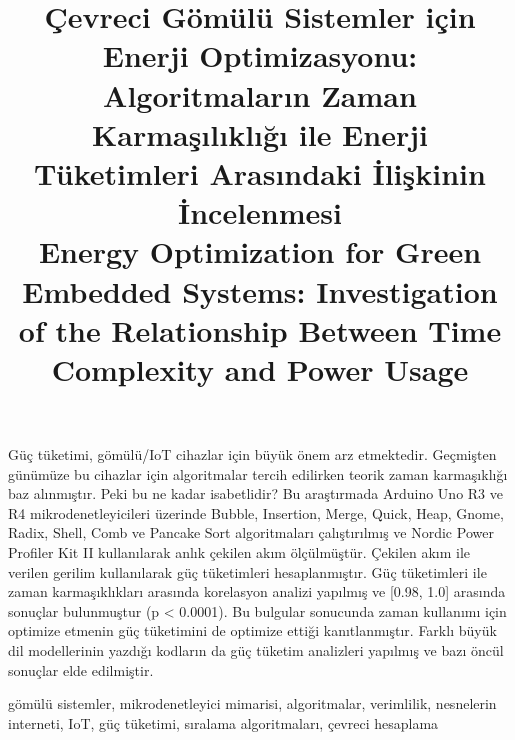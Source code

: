 \documentclass[conference, a4paper]{IEEEtran}
\begin{document}

%
\title{Çevreci Gömülü Sistemler için Enerji Optimizasyonu: Algoritmaların Zaman Karmaşılıklığı ile Enerji Tüketimleri Arasındaki İlişkinin İncelenmesi\\
Energy Optimization for Green Embedded Systems: Investigation of the Relationship Between Time Complexity and Power Usage}

\author{
\IEEEauthorblockA{\\
\\
\\
\\
\\
}
}


%

\maketitle
\begin{ozet}
Güç tüketimi, gömülü/IoT cihazlar için büyük önem arz etmektedir. Geçmişten günümüze bu cihazlar için algoritmalar tercih edilirken teorik zaman karmaşıklığı baz alınmıştır. Peki bu ne kadar isabetlidir? Bu araştırmada Arduino Uno R3 ve R4 mikrodenetleyicileri üzerinde Bubble, Insertion, Merge, Quick, Heap, Gnome, Radix, Shell, Comb ve Pancake Sort algoritmaları çalıştırılmış ve Nordic Power Profiler Kit II kullanılarak anlık çekilen akım ölçülmüştür. Çekilen akım ile verilen gerilim kullanılarak güç tüketimleri hesaplanmıştır. Güç tüketimleri ile zaman karmaşıklıkları arasında korelasyon analizi yapılmış ve [0.98, 1.0] arasında sonuçlar bulunmuştur (p < 0.0001). Bu bulgular sonucunda zaman kullanımı için optimize etmenin güç tüketimini de optimize ettiği kanıtlanmıştır. Farklı büyük dil modellerinin yazdığı kodların da güç tüketim analizleri yapılmış ve bazı öncül sonuçlar elde edilmiştir.
\end{ozet}
\begin{IEEEanahtar}
gömülü sistemler,
mikrodenetleyici mimarisi,
algoritmalar, verimlilik,
nesnelerin interneti, IoT,
güç tüketimi,
sıralama algoritmaları,
çevreci hesaplama
\end{IEEEanahtar}
\end{document}

